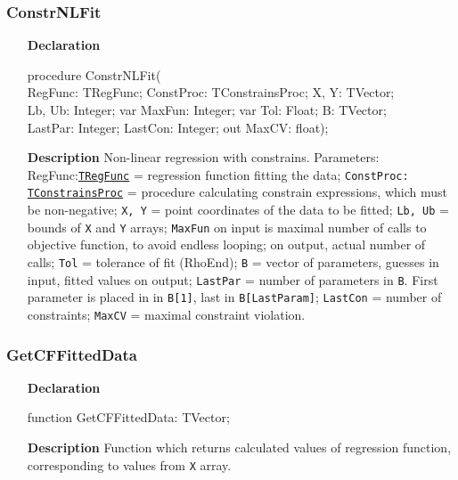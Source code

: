 \documentclass[12pt,a4paper,oneside]{report}
\newcommand{\declarationitem}[1]{\textbf{#1}}
\newcommand{\descriptiontitle}[1]{\textbf{#1}}
\newcommand{\code}[1]{\texttt{#1}}
\begin{document}
\subsubsection{ConstrNLFit}
\label{uconstrnlfit-ConstrNLFit}
\begin{itemize}
	\item[\declarationitem{Declaration}\hfill]
	\begin{flushleft}
	procedure ConstrNLFit(\\
	\hspace{12pt} RegFunc: TRegFunc; ConstProc: TConstrainsProc;  X, Y: TVector; \\
	\hspace{12pt} Lb, Ub: Integer; var MaxFun: Integer; var Tol: Float; B: TVector;\\
	\hspace{12pt} LastPar: Integer; LastCon: Integer; out MaxCV: float);
	\end{flushleft}
	\item[\descriptiontitle{Description}\hfill]
	Non-linear regression with constrains. Parameters: RegFunc:\code{\hyperref[utypes-TRegFunc]{TRegFunc}} = regression function fitting the data; \code{ConstProc: \hyperref[uconstrnlfit:tconstrainsproc]{TConstrainsProc}} = procedure calculating constrain expressions, which must be non-negative; \code{X, Y} = point coordinates of the data to be fitted; \code{Lb, Ub} = bounds of \code{X} and \code{Y} arrays; \code{MaxFun} on input is maximal number of calls to objective function, to avoid endless looping; on output, actual number of calls; \code{Tol} = tolerance of fit (RhoEnd); \code{B} = vector of parameters, guesses in input, fitted values on output; \code{LastPar} = number of parameters in \code{B}. First parameter is placed in in \code{B[1]}, last in \code{B[LastParam]}; \code{LastCon} = number of constraints; \code{MaxCV} = maximal constraint violation.
\end{itemize}
\subsubsection{GetCFFittedData}
\label{uconstrnlfit:GetCFFittedData}
\begin{itemize}
	\item[\declarationitem{Declaration}\hfill]
	\begin{flushleft}
	function GetCFFittedData: TVector;
	\end{flushleft}
	\item[\descriptiontitle{Description}\hfill]
Function which returns calculated values of regression function, corresponding to values from \code{X} array.
\end{itemize}
\end{document}
